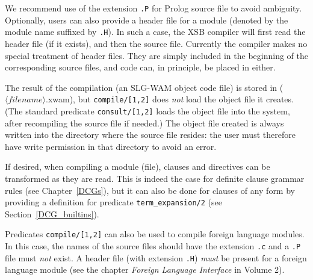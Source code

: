 \begin{description}
We recommend use of the extension {\tt .P} for Prolog source file to
avoid ambiguity.  Optionally, users can also provide a header file for
a module (denoted by the module name suffixed by {\tt .H}).  In such a
case, the XSB compiler will first read the header file (if it
exists), and then the source file.  Currently the compiler makes no
special treatment of header files.  They are simply included in the
beginning of the corresponding source files, and code can, in
principle, be placed in either.  
 
The result of the compilation (an SLG-WAM object code file) is stored
in ($\langle filename \rangle$.xwam), but {\tt compile/[1,2]} does {\em
  not\/} load the object file it creates.  (The standard predicate
{\tt consult/[1,2]} loads the object file into the system, after
recompiling the source file if needed.)  The object file created is
always written into the directory where the source file resides: the
user must therefore have write permission in that directory to avoid
an error.
 
If desired, when compiling a module (file), clauses and directives can be
transformed as they are read.  This is indeed the case for definite clause
grammar rules (see Chapter~\ref{DCGs}), but it can also be done for clauses
of any form by providing a definition for predicate {\tt term\_expansion/2}
(see Section~\ref{DCG_builtins}).

Predicates {\tt compile/[1,2]} can also be used to compile foreign
language modules.  In this case, the names of the source files should
have the extension {\tt .c} and a {\tt .P} file must {\em not\/}
exist.  A header file (with extension {\tt .H}) {\em must} be present
for a foreign language module (see the chapter {\it Foreign Language
Interface} in Volume 2).


\end{description}
